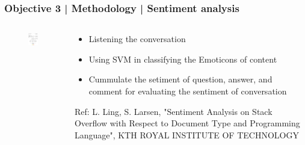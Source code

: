 \documentclass{beamer}
\begin{document}
\begin{frame}
\frametitle{Objective 3 | Methodology | Sentiment analysis}
\begin{columns}
	
	\begin{column}{.5\textwidth}
\begin{figure}
	\includegraphics[width=50mm]{st4.png}	
	
\end{figure}
\end{column}
\begin{column}{.5\textwidth}
\begin{itemize}
	\item Listening the conversation
	\item Using SVM in classifying the Emoticons of content
	\item Cummulate the setiment of question, answer, and comment for evaluating the sentiment of conversation
\end{itemize}
{\tiny Ref: L. Ling, S. Larsen, "Sentiment Analysis on Stack Overflow with
Respect to Document Type and
Programming Language", KTH ROYAL INSTITUTE OF TECHNOLOGY}

\end{column}

\end{columns}	
\end{frame}
\end{document}
